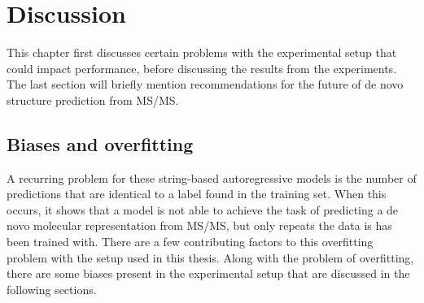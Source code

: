 \chapter{Discussion}
\label{chap:discussion}

This chapter first discusses certain problems with the experimental setup that could impact performance, before discussing the results from the experiments.
The last section will briefly mention recommendations for the future of de novo structure prediction from \ac{MS/MS}.

\section{Biases and overfitting}
\label{sec:overfitting}
 
A recurring problem for these string-based autoregressive models is the number of predictions that are identical to a label found in the training set.
When this occurs, it shows that a model is not able to achieve the task of predicting a de novo molecular representation from \ac{MS/MS}, but only repeats the data is has been trained with.
There are a few contributing factors to this overfitting problem with the setup used in this thesis.
Along with the problem of overfitting, there are some biases present in the experimental setup that are discussed in the following sections. 

